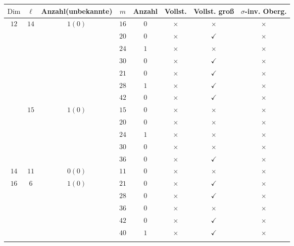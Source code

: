 \documentclass[12pt,a4paper,halfparskip,headsepline,bibtotocnumbered]{scrreprt}
\theoremstyle{nummermitklammern}
\theoremstyle{nonumberbreak}
\newcommand{\Dim}{\text{Dim}}
\begin{document}
\begin{table}[H]
	\centering
	\begin{tabular}{|c|c|c|c|c|c|c|c|}
		\hline		
		$\Dim$					&$\ell$					&{Anzahl(unbekannte)}		&$m$	&Anzahl	&Vollst.	&Vollst. groß	&$\sigma$-inv. Oberg.\\ \hline
		\multirow{12}{*}{$12$}	&\multirow{7}{*}{$14$}	&\multirow{7}{*}{$1(0)$}	&$16$	&$0$	&$\times$		&$\times$		&$\times$\\ \cline{4-8}
								&						&							&$20$	&$0$	&$\times$		&$\checkmark$	&$\times$\\ \cline{4-8}
								&						&							&$24$	&$1$	&$\times$		&$\times$		&$\times$\\ \cline{4-8}
								&						&							&$30$	&$0$	&$\times$		&$\checkmark$	&$\times$\\ \cline{4-8}
								&						&							&$21$	&$0$	&$\times$		&$\checkmark$	&$\times$\\ \cline{4-8}
								&						&							&$28$	&$1$	&$\times$		&$\checkmark$	&$\times$\\ \cline{4-8}
								&						&							&$42$	&$0$	&$\times$		&$\checkmark$	&$\times$\\ \cline{2-8}
								&\multirow{5}{*}{$15$}	&\multirow{5}{*}{$1(0)$}	&$15$	&$0$	&$\times$		&$\times$		&$\times$\\ \cline{4-8}
								&						&							&$20$	&$0$	&$\times$		&$\times$		&$\times$\\ \cline{4-8}
								&						&							&$24$	&$1$	&$\times$		&$\times$		&$\times$\\ \cline{4-8}
								&						&							&$30$	&$0$	&$\times$		&$\times$		&$\times$\\ \cline{4-8}
								&						&							&$36$	&$0$	&$\times$		&$\checkmark$	&$\times$\\ \hline
		\multirow{1}{*}{$14$}	&\multirow{1}{*}{$11$}	&\multirow{1}{*}{$0(0)$}	&$11$	&$0$	&$\times$		&$\times$		&$\times$\\ \hline
		\multirow{13}{*}{$16$}	&\multirow{7}{*}{$6$}	&\multirow{7}{*}{$1(0)$}	&$21$	&$0$	&$\times$		&$\checkmark$	&$\times$\\ \cline{4-8}
								&						&							&$28$	&$0$	&$\times$		&$\checkmark$	&$\times$\\ \cline{4-8}
								&						&							&$36$	&$0$	&$\times$		&$\times$		&$\times$\\ \cline{4-8}
								&						&							&$42$	&$0$	&$\times$		&$\checkmark$	&$\times$\\ \cline{4-8}
								&						&							&$40$	&$1$	&$\times$		&$\checkmark$	&$\times$\\ \cline{4-8}

\end{tabular}
\end{table}
\end{document}
